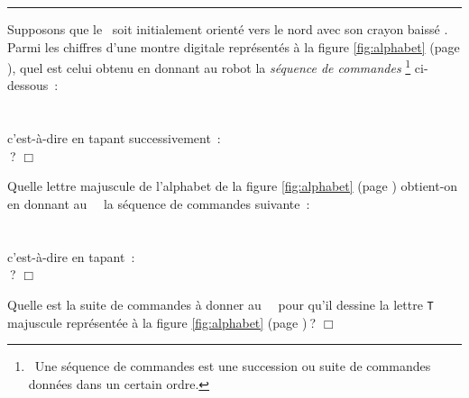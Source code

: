 \clearpage\nopagebreak
\noindent \rule{137mm}{0.1mm} %
\begin{exercice}{
Supposons que le \robot\ soit initialement orienté vers le nord
avec son crayon baissé \robotCbN\/.  Parmi les chiffres d'une montre digitale 
re\-pré\-sen\-tés à la figure \ref{fig:alphabet} (page \pageref{fig:alphabet}), quel est
celui obtenu en donnant au robot la {\em séquence de commandes}%
\footnote{\ Une séquence  de commandes est une succession ou suite de commandes données dans un certain ordre.}
  \hbox{ci-dessous~:}\\
\hspace*{2ex}{\idt pqtd();\ av();\ pqtg();\ av();\ av();\ pqtg()}\\
\hspace*{2ex}{\idt av();\ pqtg();\ av();\ pqtg();\ av()}\\
c'est-à-dire en tapant \hbox{successivement~:}\\
\hspace*{2ex}\touche{$+$}  \touche{$-$}   \touche{$-$}  \touche{$-$} 
 \touche{$-$} $\:$?
$\Box$}\end{exercice}

\begin{exercice}{
Quelle lettre majuscule de l'alphabet  de la figure \ref{fig:alphabet} (page \pageref{fig:alphabet})
obtient-on en donnant au \robot\ \robotCbN\ la séquence de commandes \hbox{suivante~:}\\
\hspace*{2ex}{\idt av();\ av();\ pqtd();\ av();\ pqtd();\ pqtd();\ av()}\\
\hspace*{2ex}{\idt pqtd();\ av();\ av();\ pqtd();\ av();\ av()}\\
c'est-à-dire en \hbox{tapant~:}\\
\hspace*{2ex}  \touche{$+$}  \touche{$+$} \touche{$+$}  \touche{$+$}  
 \touche{$+$}  $\:$?
$\Box$}\end{exercice}

\begin{exercice}{
Quelle est la suite de commandes à donner au \robot\ \robotCbN\ pour qu'il dessine 
la lettre {\tt T} majuscule représentée à la figure \ref{fig:alphabet} (page \pageref{fig:alphabet})$\:$?
$\Box$}\end{exercice}

